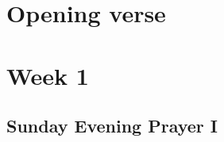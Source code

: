 

\chapter{Opening verse}

{%
\parindent 0pt
\noindent
\ifx\preLilyPondExample \undefined
\else
  \expandafter\preLilyPondExample
\fi
\def\lilypondbook{}%

\ifx\postLilyPondExample \undefined
\else
  \expandafter\postLilyPondExample
\fi
}

\chapter{Week 1}

\section{Sunday Evening Prayer I}


{%
\parindent 0pt
\noindent
\ifx\preLilyPondExample \undefined
\else
  \expandafter\preLilyPondExample
\fi
\def\lilypondbook{}%

\ifx\postLilyPondExample \undefined
\else
  \expandafter\postLilyPondExample
\fi
}

\null\medskip{%
\parindent 0pt
\noindent
\ifx\preLilyPondExample \undefined
\else
  \expandafter\preLilyPondExample
\fi
\def\lilypondbook{}%

\ifx\postLilyPondExample \undefined
\else
  \expandafter\postLilyPondExample
\fi
}

\newpage

{%
\parindent 0pt
\noindent
\ifx\preLilyPondExample \undefined
\else
  \expandafter\preLilyPondExample
\fi
\def\lilypondbook{}%

\ifx\postLilyPondExample \undefined
\else
  \expandafter\postLilyPondExample
\fi
}

\null\medskip{%
\parindent 0pt
\noindent
\ifx\preLilyPondExample \undefined
\else
  \expandafter\preLilyPondExample
\fi
\def\lilypondbook{}%

\ifx\postLilyPondExample \undefined
\else
  \expandafter\postLilyPondExample
\fi
}

\newpage

{%
\parindent 0pt
\noindent
\ifx\preLilyPondExample \undefined
\else
  \expandafter\preLilyPondExample
\fi
\def\lilypondbook{}%

\ifx\postLilyPondExample \undefined
\else
  \expandafter\postLilyPondExample
\fi
}

